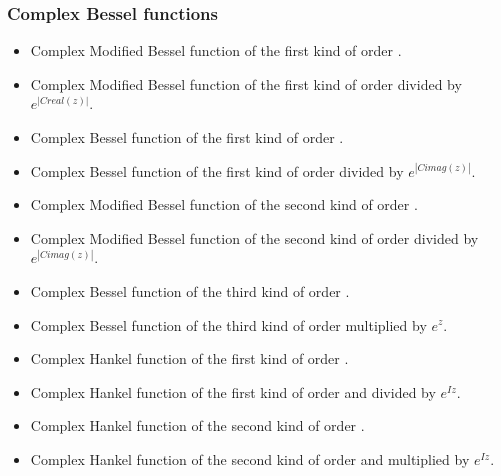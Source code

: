 \subsubsection{Complex Bessel functions}

\begin{itemize}
\item {}
  \sshortdescribe  Complex Modified Bessel function of the first
  kind of order .
\item {}
  \sshortdescribe  Complex Modified Bessel function of the first
  kind of order  divided by $e^{|Creal(z)|}$.
\item {}
  \sshortdescribe  Complex  Bessel function of the first
  kind of order .
\item {}
  \sshortdescribe  Complex  Bessel function of the first
  kind of order  divided by $e^{|Cimag(z)|}$.
\item {}
  \sshortdescribe  Complex Modified Bessel function of the second
  kind of order .
\item {}
  \sshortdescribe  Complex Modified Bessel function of the second
  kind of order  divided by $e^{|Cimag(z)|}$.
\item {}
  \sshortdescribe  Complex Bessel function of the third
  kind of order .
\item {}
  \sshortdescribe  Complex Bessel function of the third
  kind of order  multiplied by $e^{z}$.
\item {}
  \sshortdescribe  Complex Hankel function of the first kind of
  order . 
\item {}
  \sshortdescribe  Complex  Hankel function of the first kind of order
    and divided by $e^{I z}$.
\item {}
  \sshortdescribe  Complex  Hankel function of the second kind of
  order . 
\item {}
  \sshortdescribe  Complex  Hankel function of the second kind of
  order   and multiplied by $e^{I z}$.
\end{itemize}

